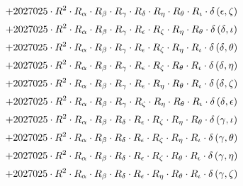 \begin{subequations}
\begin{gather}
 \\[0.2em] \notag 		 + 2027025 \cdot R^{2} \cdot R_{\alpha{}} \cdot R_{\beta{}} \cdot R_{\gamma{}} \cdot R_{\delta{}} \cdot R_{\eta{}} \cdot R_{\theta{}} \cdot R_{\iota{}} \cdot \delta{}\left(\epsilon{}, \zeta{}\right) 
 \\[0.2em] \notag 		 + 2027025 \cdot R^{2} \cdot R_{\alpha{}} \cdot R_{\beta{}} \cdot R_{\gamma{}} \cdot R_{\epsilon{}} \cdot R_{\zeta{}} \cdot R_{\eta{}} \cdot R_{\theta{}} \cdot \delta{}\left(\delta{}, \iota{}\right) 
 \\[0.2em] \notag 		 + 2027025 \cdot R^{2} \cdot R_{\alpha{}} \cdot R_{\beta{}} \cdot R_{\gamma{}} \cdot R_{\epsilon{}} \cdot R_{\zeta{}} \cdot R_{\eta{}} \cdot R_{\iota{}} \cdot \delta{}\left(\delta{}, \theta{}\right) 
 \\[0.2em] \notag 		 + 2027025 \cdot R^{2} \cdot R_{\alpha{}} \cdot R_{\beta{}} \cdot R_{\gamma{}} \cdot R_{\epsilon{}} \cdot R_{\zeta{}} \cdot R_{\theta{}} \cdot R_{\iota{}} \cdot \delta{}\left(\delta{}, \eta{}\right) 
 \\[0.2em] \notag 		 + 2027025 \cdot R^{2} \cdot R_{\alpha{}} \cdot R_{\beta{}} \cdot R_{\gamma{}} \cdot R_{\epsilon{}} \cdot R_{\eta{}} \cdot R_{\theta{}} \cdot R_{\iota{}} \cdot \delta{}\left(\delta{}, \zeta{}\right) 
 \\[0.2em] \notag 		 + 2027025 \cdot R^{2} \cdot R_{\alpha{}} \cdot R_{\beta{}} \cdot R_{\gamma{}} \cdot R_{\zeta{}} \cdot R_{\eta{}} \cdot R_{\theta{}} \cdot R_{\iota{}} \cdot \delta{}\left(\delta{}, \epsilon{}\right) 
 \\[0.2em] \notag 		 + 2027025 \cdot R^{2} \cdot R_{\alpha{}} \cdot R_{\beta{}} \cdot R_{\delta{}} \cdot R_{\epsilon{}} \cdot R_{\zeta{}} \cdot R_{\eta{}} \cdot R_{\theta{}} \cdot \delta{}\left(\gamma{}, \iota{}\right) 
 \\[0.2em] \notag 		 + 2027025 \cdot R^{2} \cdot R_{\alpha{}} \cdot R_{\beta{}} \cdot R_{\delta{}} \cdot R_{\epsilon{}} \cdot R_{\zeta{}} \cdot R_{\eta{}} \cdot R_{\iota{}} \cdot \delta{}\left(\gamma{}, \theta{}\right) 
 \\[0.2em] \notag 		 + 2027025 \cdot R^{2} \cdot R_{\alpha{}} \cdot R_{\beta{}} \cdot R_{\delta{}} \cdot R_{\epsilon{}} \cdot R_{\zeta{}} \cdot R_{\theta{}} \cdot R_{\iota{}} \cdot \delta{}\left(\gamma{}, \eta{}\right) 
 \\[0.2em] \notag 		 + 2027025 \cdot R^{2} \cdot R_{\alpha{}} \cdot R_{\beta{}} \cdot R_{\delta{}} \cdot R_{\epsilon{}} \cdot R_{\eta{}} \cdot R_{\theta{}} \cdot R_{\iota{}} \cdot \delta{}\left(\gamma{}, \zeta{}\right) 

\end{gather}
\end{subequations}
